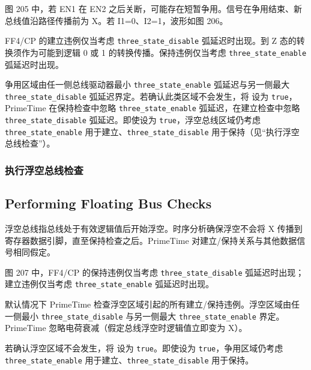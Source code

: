 
图 205 中，若 EN1 在 EN2 之后关断，可能存在短暂争用。信号在争用结束、新总线值沿路径传播前为 X。若 I1=0、I2=1，波形如图 206。

FF4/CP 的建立违例仅当考虑 \texttt{three\_state\_disable} 弧延迟时出现。到 Z 态的转换须作为可能到逻辑 0 或 1 的转换传播。保持违例仅当考虑 \texttt{three\_state\_enable} 弧延迟时出现。

争用区域由任一侧总线驱动器最小 \texttt{three\_state\_enable} 弧延迟与另一侧最大 \texttt{three\_state\_disable} 弧延迟界定。若确认此类区域不会发生，将  设为 \texttt{true}，PrimeTime 在保持检查中忽略 \texttt{three\_state\_enable} 弧延迟，在建立检查中忽略 \texttt{three\_state\_disable} 弧延迟。即使设为 \texttt{true}，浮空总线区域仍考虑 \texttt{three\_state\_enable} 用于建立、\texttt{three\_state\_disable} 用于保持（见“执行浮空总线检查”）。

\subsubsection{执行浮空总线检查}
\subsection*{Performing Floating Bus Checks}

浮空总线指总线处于有效逻辑值后开始浮空。时序分析确保浮空不会将 X 传播到寄存器数据引脚，直至保持检查之后。PrimeTime 对建立/保持关系与其他数据信号相同假定。


图 207 中，FF4/CP 的保持违例仅当考虑 \texttt{three\_state\_disable} 弧延迟时出现；建立违例仅当考虑 \texttt{three\_state\_enable} 弧延迟时出现。

默认情况下 PrimeTime 检查浮空区域引起的所有建立/保持违例。浮空区域由任一侧最小 \texttt{three\_state\_disable} 与另一侧最大 \texttt{three\_state\_enable} 界定。PrimeTime 忽略电荷衰减（假定总线浮空时逻辑值立即变为 X）。

若确认浮空区域不会发生，将  设为 \texttt{true}。即使设为 \texttt{true}，争用区域仍考虑 \texttt{three\_state\_enable} 用于建立、\texttt{three\_state\_disable} 用于保持。

